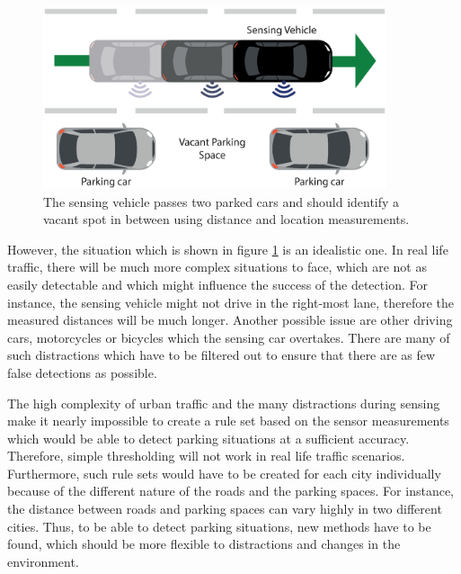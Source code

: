 \begin{figure}
	\centering
	\includegraphics[width=0.9\textwidth]{img/drive-by-parking-situation-pictogram.eps}
	\caption{The sensing vehicle passes two parked cars and should identify a vacant spot in between using distance and location measurements. }
	\label{fig:driveby_standard_parking_situation}
\end{figure}

However, the situation which is shown in figure \ref{fig:driveby_standard_parking_situation} is an idealistic one. In real life traffic, there will be much more complex situations to face, which are not as easily detectable and which might influence the success of the detection. For instance, the sensing vehicle might not drive in the right-most lane, therefore the measured distances will be much longer. Another possible issue are other driving cars, motorcycles or bicycles which the sensing car overtakes. There are many of such distractions which have to be filtered out to ensure that there are as few false detections as possible. 

The high complexity of urban traffic and the many distractions during sensing make it nearly impossible to create a rule set based on the sensor measurements which would be able to detect parking situations at a sufficient accuracy. Therefore, simple thresholding will not work in real life traffic scenarios. Furthermore, such rule sets would have to be created for each city individually because of the different nature of the roads and the parking spaces. For instance, the distance between roads and parking spaces can vary highly in two different cities. Thus, to be able to detect parking situations, new methods have to be found, which should be more flexible to distractions and changes in the environment.

